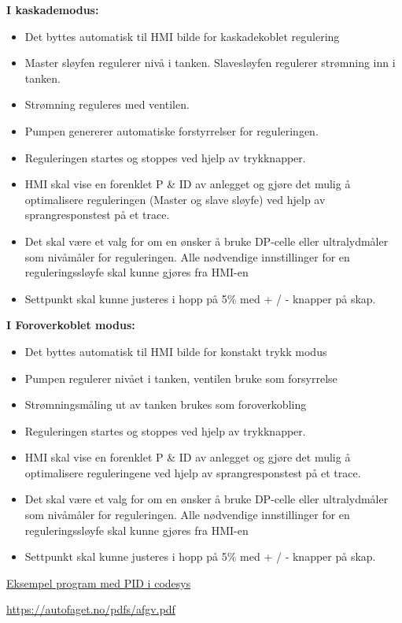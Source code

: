 \textbf{I kaskademodus:}

\begin{itemize}[noitemsep]
	\item Det byttes automatisk til HMI bilde for kaskadekoblet regulering 
	\item Master sløyfen regulerer nivå i tanken. Slavesløyfen regulerer strømning inn i tanken. 
	\item Strømning reguleres med ventilen. 
	\item Pumpen genererer automatiske forstyrrelser for reguleringen. 
	\item Reguleringen startes og stoppes ved hjelp av trykknapper.   
	\item HMI skal vise en forenklet P \& ID av anlegget og gjøre det mulig å optimalisere reguleringen (Master og slave sløyfe) ved hjelp av sprangresponstest på et trace.  
	\item Det skal være et valg for om en ønsker å bruke DP-celle eller ultralydmåler som nivåmåler for reguleringen. Alle nødvendige innstillinger for en reguleringssløyfe skal kunne gjøres fra HMI-en 
	\item Settpunkt skal kunne justeres i hopp på 5\% med + / - knapper på skap.  

\end{itemize}



\textbf{I Foroverkoblet modus:}

\begin{itemize}[noitemsep]
	\item Det byttes automatisk til HMI bilde for konstakt trykk modus 
	\item Pumpen regulerer nivået i tanken, ventilen bruke som forsyrrelse
	\item Strømningsmåling ut av tanken brukes som foroverkobling
	\item Reguleringen startes og stoppes ved hjelp av trykknapper.   
	\item HMI skal vise en forenklet P \& ID av anlegget og gjøre det mulig å optimalisere reguleringene ved hjelp av sprangresponstest på et trace.  
	\item Det skal være et valg for om en ønsker å bruke DP-celle eller ultralydmåler som nivåmåler for reguleringen. Alle nødvendige innstillinger for en reguleringssløyfe skal kunne gjøres fra HMI-en 
	\item Settpunkt skal kunne justeres i hopp på 5\% med + / - knapper på skap.  

\end{itemize}


\href{https://rfka-my.sharepoint.com/:u:/g/personal/fred-olav_mosdal_skole_rogfk_no/EewzybzUnq5PscHy_uJUvUMB3ufsOB417mgUkhGlC8yQrg?e=rPkbpf}{Eksempel program med PID i codesys}

\vskip 5pt 

\vskip 5pt 


 
\vskip 5pt 
\url {https://autofaget.no/pdfs/afgv.pdf}


